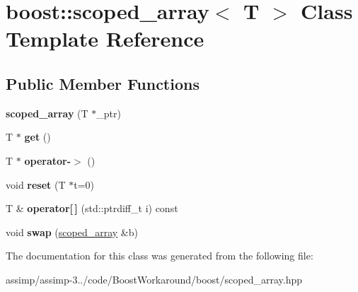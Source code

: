 \hypertarget{classboost_1_1scoped__array}{\section{boost\+:\+:scoped\+\_\+array$<$ T $>$ Class Template Reference}
\label{classboost_1_1scoped__array}
}
\subsection*{Public Member Functions}
\begin{DoxyCompactItemize}
\item 
\hypertarget{classboost_1_1scoped__array_a2e47c6b82d4a2f7adbb3d9a8209c75cc}{{\bfseries scoped\+\_\+array} (T $\ast$\+\_\+ptr)}\label{classboost_1_1scoped__array_a2e47c6b82d4a2f7adbb3d9a8209c75cc}

\item 
\hypertarget{classboost_1_1scoped__array_aaecd1c179000902c36e305920cba353f}{T $\ast$ {\bfseries get} ()}\label{classboost_1_1scoped__array_aaecd1c179000902c36e305920cba353f}

\item 
\hypertarget{classboost_1_1scoped__array_a11efb093329aecabd2603355b8e5b301}{T $\ast$ {\bfseries operator-\/$>$} ()}\label{classboost_1_1scoped__array_a11efb093329aecabd2603355b8e5b301}

\item 
\hypertarget{classboost_1_1scoped__array_af8c03eb3a7578c9d71ef4ef5db09b321}{void {\bfseries reset} (T $\ast$t=0)}\label{classboost_1_1scoped__array_af8c03eb3a7578c9d71ef4ef5db09b321}

\item 
\hypertarget{classboost_1_1scoped__array_a0abb16f7eaf6bf0ee89760f92e75a618}{T \& {\bfseries operator\mbox{[}$\,$\mbox{]}} (std\+::ptrdiff\+\_\+t i) const }\label{classboost_1_1scoped__array_a0abb16f7eaf6bf0ee89760f92e75a618}

\item 
\hypertarget{classboost_1_1scoped__array_a55287ed0f281eec927a74d3f39449bbc}{void {\bfseries swap} (\hyperlink{classboost_1_1scoped__array}{scoped\+\_\+array} \&b)}\label{classboost_1_1scoped__array_a55287ed0f281eec927a74d3f39449bbc}

\end{DoxyCompactItemize}


The documentation for this class was generated from the following file\+:\begin{DoxyCompactItemize}
\item 
assimp/assimp-\/3../code/\+Boost\+Workaround/boost/scoped\+\_\+array.\+hpp\end{DoxyCompactItemize}
